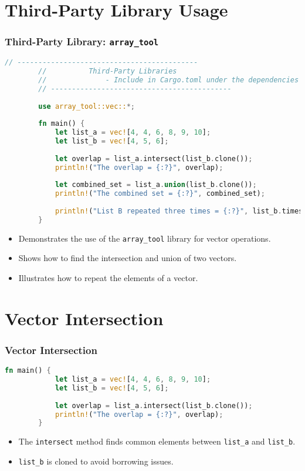 \documentclass[aspectratio=169, table]{beamer}
\begin{document}
\section{Third-Party Library Usage}
\begin{frame}[fragile]
	\frametitle{Third-Party Library: \texttt{array\_tool}}
	\begin{lstlisting}[language=Rust]
		// -------------------------------------------
		//          Third-Party Libraries
		//              - Include in Cargo.toml under the dependencies array_tool = "1.0.3"
		// -------------------------------------------
		
		use array_tool::vec::*;
		
		fn main() {
			let list_a = vec![4, 4, 6, 8, 9, 10];
			let list_b = vec![4, 5, 6];
			
			let overlap = list_a.intersect(list_b.clone());
			println!("The overlap = {:?}", overlap);
			
			let combined_set = list_a.union(list_b.clone());
			println!("The combined set = {:?}", combined_set);
			
			println!("List B repeated three times = {:?}", list_b.times(3));
		}
	\end{lstlisting}
	\begin{itemize}
		\item Demonstrates the use of the \texttt{array\_tool} library for vector operations.
		\item Shows how to find the intersection and union of two vectors.
		\item Illustrates how to repeat the elements of a vector.
	\end{itemize}
\end{frame}

\section{Vector Intersection}
\begin{frame}[fragile]
	\frametitle{Vector Intersection}
	\begin{lstlisting}[language=Rust]
		fn main() {
			let list_a = vec![4, 4, 6, 8, 9, 10];
			let list_b = vec![4, 5, 6];
			
			let overlap = list_a.intersect(list_b.clone());
			println!("The overlap = {:?}", overlap);
		}
	\end{lstlisting}
	\begin{itemize}
		\item The \texttt{intersect} method finds common elements between \texttt{list\_a} and \texttt{list\_b}.
		\item \texttt{list\_b} is cloned to avoid borrowing issues.
	\end{itemize}
\end{frame}
\end{document}
